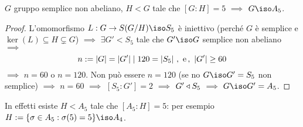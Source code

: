 \begin{prop}
$G$ gruppo semplice non abeliano, $H<G$ tale che $[G:H]=5$ $\implies$ $G\iso A_5$.
\end{prop}

\begin{proof}
L'omomorfismo $L : G\to S(G/H)\iso S_5$ è iniettivo (perché $G$ è semplice e $\ker(L)\subseteq H\subsetneq G$) $\implies$ $\exists G'<S_5$ tale che $G'\iso G$ semplice non abeliano $\implies$
\[
n:=\left\lvert G\right\rvert=\left\lvert G'\right\rvert\mid120=\left\lvert S_5\right\rvert \,,\ \text{e} \,,\ \left\lvert G'\right\rvert\ge60
\]
$\implies$ $n=60$ o $n=120$. Non pu\`o essere $n=120$ (se no $G\iso G'=S_5$ non semplice) $\implies$ $n=60$ $\implies$ $[S_5:G']=2$ $\implies$ $G' \triangleleft S_5$ $\implies$ $G\iso G'=A_5$.
\end{proof}
\begin{osse}
In effetti esiste $H<A_5$ tale che $[A_5:H]=5$: per esempio $H:=\{\sigma\in A_5 : \sigma(5)=5\}\iso A_4$.
\end{osse}